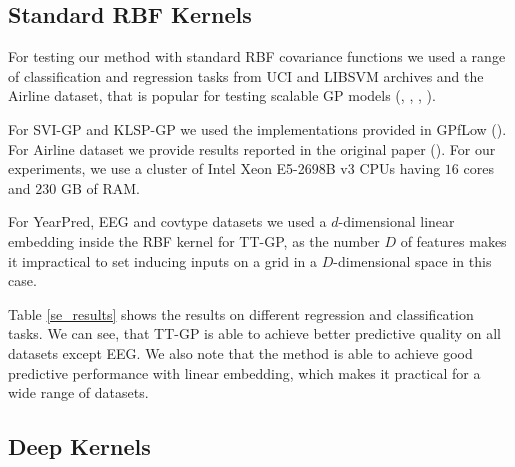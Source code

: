 \subsection{Standard RBF Kernels}

For testing our method with standard RBF covariance functions we used a range of
classification and regression tasks from UCI and LIBSVM archives and the
Airline dataset, that is popular for testing scalable GP models
(\citet{hensman2013}, \citet{hensman2015}, \citet{wilson2016stochastic},
\citet{cutajar2016}).

For SVI-GP and KLSP-GP we used the implementations provided in GPfLow
(\citet{GPflow2016}). For Airline dataset we provide results reported in
the original paper (\citet{hensman2015}). For our experiments, we use a cluster of Intel Xeon E5-2698B v3 CPUs having $16$ cores and $230$ GB
of RAM.

For YearPred, EEG and covtype datasets we used a $d$-dimensional linear embedding inside the RBF kernel for TT-GP, as the number $D$ of features makes it
impractical to set inducing inputs on a grid in a $D$-dimensional space in this case.

  

Table \ref{se_results} shows the results on different regression and
classification tasks. We can see, that TT-GP is able to achieve better
predictive quality on all datasets except EEG. We also note that the
method is able to achieve good predictive performance with linear
embedding, which makes it practical for a wide range of datasets.

\subsection{Deep Kernels}

